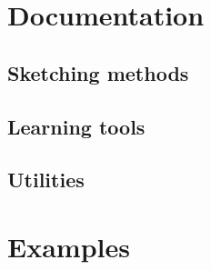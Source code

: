 \documentclass[]{article}
\begin{document}
\section{Documentation}
\subsection{Sketching methods} 

\subsection{Learning tools} 

\subsection{Utilities} 

\section{Examples}


\newpage


\end{document}
